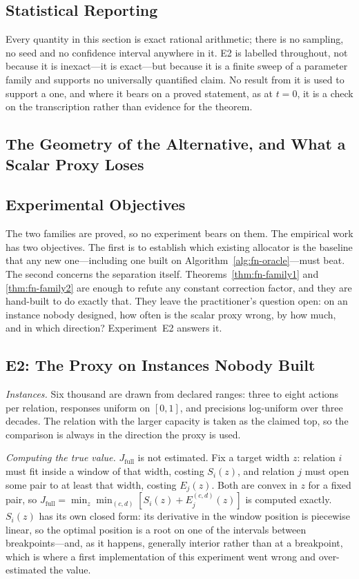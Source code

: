 \subsection{Statistical Reporting}

Every quantity in this section is exact rational arithmetic; there is no sampling, no seed and
no confidence interval anywhere in it. E2 is labelled \NUM{} throughout, not because it is
inexact---it is exact---but because it is a finite sweep of a parameter family and supports no
universally quantified claim. No result from it is used to support a \PROVED{} one, and where
it bears on a proved statement, as at $t=0$, it is a check on the transcription rather than
evidence for the theorem.


\subsection{The Geometry of the Alternative, and What a Scalar Proxy Loses}
\label{sec:fn-expdesign}

\subsection{Experimental Objectives}

The two families are proved, so no experiment bears on them. The empirical work has two
objectives. The first is to establish which existing allocator is the baseline that any new
one---including one built on Algorithm~\ref{alg:fn-oracle}---must beat. The second concerns the
separation itself. Theorems~\ref{thm:fn-family1} and \ref{thm:fn-family2} are enough to refute any
constant correction factor, and they are hand-built to do exactly that. They leave the
practitioner's question open: on an instance nobody designed, how often is the scalar proxy
wrong, by how much, and in which direction? Experiment~E2 answers it.

\subsection{E2: The Proxy on Instances Nobody Built}
\label{sec:fn-e2}

\emph{Instances.} Six thousand are drawn from declared ranges: three to eight actions per
relation, responses uniform on $[0,1]$, and precisions log-uniform over three decades. The
relation with the larger capacity is taken as the claimed top, so the comparison is always in
the direction the proxy is used.

\emph{Computing the true value.} $J_{\mathrm{full}}$ is not estimated. Fix a target width
$z$: relation $i$ must fit inside a window of that width, costing $S_{i}(z)$, and relation
$j$ must open some pair to at least that width, costing $E_{j}(z)$. Both are convex in $z$
for a fixed pair, so $J_{\mathrm{full}}=\min_{z}\min_{(c,d)}[S_{i}(z)+E^{(c,d)}_{j}(z)]$ is
computed exactly. $S_{i}(z)$ has its own closed form: its derivative in the window position
is piecewise linear, so the optimal position is a root on one of the intervals between
breakpoints---and, as it happens, generally interior rather than at a breakpoint, which is
where a first implementation of this experiment went wrong and over-estimated the value.

